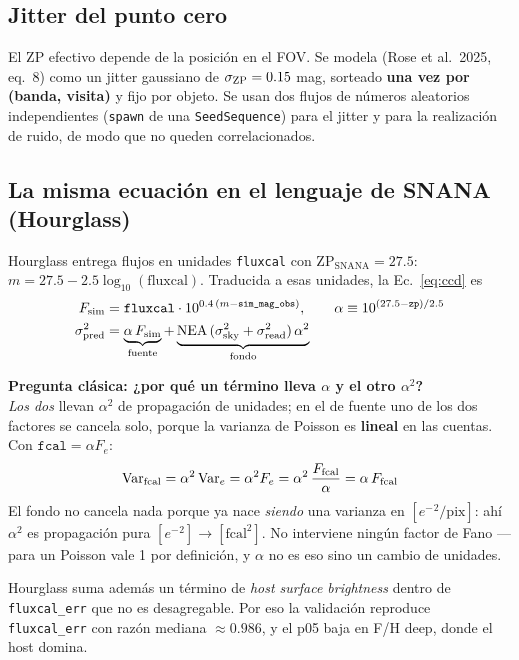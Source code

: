 \documentclass[11pt,a4paper]{article}
\newcommand{\code}[1]{\texttt{\small #1}}
\newcommand{\eminus}{e^{-}}
\newlength{\examenpad}
\newenvironment{examen}
  {\par\medskip\noindent
   \begin{lrbox}{\examenbox}%
   \begin{minipage}{\dimexpr\linewidth-2\examenpad}\small}
  {\end{minipage}%
   \end{lrbox}%
   {\setlength{\fboxsep}{\examenpad}\colorbox{boxgray}{\usebox{\examenbox}}}%
   \par\medskip}
\begin{document}
\subsection{Jitter del punto cero}
El $\mathrm{ZP}$ efectivo depende de la posición en el FOV. Se modela (Rose et al.\ 2025, eq.\ 8)
como un jitter gaussiano de $\sigma_{\rm ZP}=0.15$ mag, sorteado \textbf{una vez por (banda,
visita)} y fijo por objeto. Se usan dos flujos de números aleatorios independientes (\code{spawn}
de una \code{SeedSequence}) para el jitter y para la realización de ruido, de modo que no queden
correlacionados.

\subsection{La misma ecuación en el lenguaje de SNANA (Hourglass)}
Hourglass entrega flujos en unidades \code{fluxcal} con $\mathrm{ZP_{SNANA}}=27.5$:
$m = 27.5 - 2.5\log_{10}(\text{fluxcal})$. Traducida a esas unidades, la Ec.\ \eqref{eq:ccd} es
\begin{align}
F_{\rm sim} &= \texttt{fluxcal}\cdot 10^{0.4\,(m - \texttt{sim\_mag\_obs})}, \qquad
\alpha \equiv 10^{(27.5-\texttt{zp})/2.5} \\
\sigma^2_{\rm pred} &= \underbrace{\alpha\,F_{\rm sim}}_{\text{fuente}}
 + \underbrace{\mathrm{NEA}\,(\sigma_{\rm sky}^2+\sigma_{\rm read}^2)\,\alpha^2}_{\text{fondo}}
\end{align}

\begin{examen}
\textbf{Pregunta clásica: ¿por qué un término lleva $\alpha$ y el otro $\alpha^2$?}\\
\emph{Los dos} llevan $\alpha^2$ de propagación de unidades; en el de fuente uno de los dos factores
se cancela solo, porque la varianza de Poisson es \textbf{lineal} en las cuentas. Con
$\texttt{fcal} = \alpha F_e$:
\[
\mathrm{Var}_{\rm fcal} = \alpha^2\,\mathrm{Var}_{e} = \alpha^2 F_e
 = \alpha^2\,\frac{F_{\rm fcal}}{\alpha} = \alpha\,F_{\rm fcal}
\]
El fondo no cancela nada porque ya nace \emph{siendo} una varianza en $[\eminus{}^2/\text{pix}]$: ahí
$\alpha^2$ es propagación pura $[\eminus{}^2]\to[\text{fcal}^2]$. No interviene ningún factor de
Fano --- para un Poisson vale 1 por definición, y $\alpha$ no es eso sino un cambio de unidades.
\end{examen}

Hourglass suma además un término de \emph{host surface brightness} dentro de \code{fluxcal\_err} que
no es desagregable. Por eso la validación reproduce \code{fluxcal\_err} con razón mediana
$\approx 0.986$, y el p05 baja en F/H deep, donde el host domina.
\end{document}
